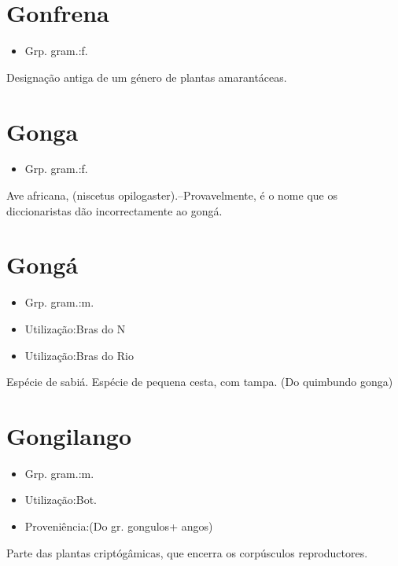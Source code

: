 \section{Gonfrena}
\begin{itemize}
\item {Grp. gram.:f.}
\end{itemize}
Designação antiga de um género de plantas amarantáceas.
\section{Gonga}
\begin{itemize}
\item {Grp. gram.:f.}
\end{itemize}
Ave africana, (\textunderscore niscetus opilogaster\textunderscore ).--Provavelmente, é o nome que os diccionaristas dão incorrectamente ao \textunderscore gongá\textunderscore .
\section{Gongá}
\begin{itemize}
\item {Grp. gram.:m.}
\end{itemize}
\begin{itemize}
\item {Utilização:Bras do N}
\end{itemize}
\begin{itemize}
\item {Utilização:Bras do Rio}
\end{itemize}
Espécie de sabiá.
Espécie de pequena cesta, com tampa.
(Do quimbundo \textunderscore gonga\textunderscore )
\section{Gongilango}
\begin{itemize}
\item {Grp. gram.:m.}
\end{itemize}
\begin{itemize}
\item {Utilização:Bot.}
\end{itemize}
\begin{itemize}
\item {Proveniência:(Do gr. \textunderscore gongulos\textunderscore  + \textunderscore angos\textunderscore )}
\end{itemize}
Parte das plantas criptógâmicas, que encerra os corpúsculos reproductores.

